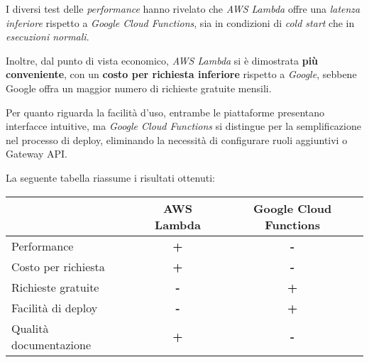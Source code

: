 I diversi test delle \textit{performance} hanno rivelato che \textit{AWS Lambda} offre una \textit{latenza inferiore} rispetto a \textit{Google Cloud Functions}, sia in condizioni di \textit{cold start} che in \textit{esecuzioni normali}. 

Inoltre, dal punto di vista economico, \textit{AWS Lambda} si è dimostrata \textbf{più conveniente}, con un \textbf{costo per richiesta inferiore} rispetto a \textit{Google}, sebbene Google offra un maggior numero di richieste gratuite mensili. 

Per quanto riguarda la facilità d'uso, entrambe le piattaforme presentano interfacce intuitive, ma \textit{Google Cloud Functions} si distingue per la semplificazione nel processo di deploy, eliminando la necessità di configurare ruoli aggiuntivi o Gateway API.

\newpage

La seguente tabella riassume i risultati ottenuti:
\begin{table}[htbp]
\centering
\begin{tabular}{lcc}
\toprule
 & AWS Lambda & Google Cloud Functions \\
\midrule
Performance & \textbf{+} & \textbf{-} \\
Costo per richiesta & \textbf{+} & \textbf{-} \\
Richieste gratuite & \textbf{-} & \textbf{+} \\
Facilità di deploy & \textbf{-} & \textbf{+} \\
Qualità documentazione & \textbf{+} & \textbf{-} \\
\bottomrule
\end{tabular}
\end{table}